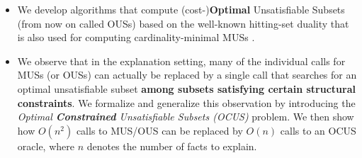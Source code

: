 \documentclass[a4paper,UKenglish,cleveref, autoref, thm-restate, pdfa]{lipics-v2021}
\begin{document}
\begin{itemize}
	\item We develop algorithms that compute (cost-)\textbf{Optimal} Unsatisfiable Subsets (from now on called OUSs) based on the well-known hitting-set duality that is also used for computing cardinality-minimal MUSs \cite{ignatiev2015smallest,DBLP:conf/kr/SaikkoWJ16}.
	
	\item We observe that in the explanation setting, many of the individual calls for MUSs (or OUSs) can actually be replaced by a single call that searches for an optimal unsatisfiable subset \textbf{among subsets satisfying certain structural constraints}. 
	We formalize and generalize this observation by introducing the \emph{Optimal \textbf{Constrained} Unsatisfiable Subsets (OCUS)} problem. We then show how $O(n^2)$ calls to MUS/OUS can be replaced by $O(n)$ calls to an OCUS oracle, where $n$ denotes the number of facts to explain. 
	

\end{itemize}
\end{document}
